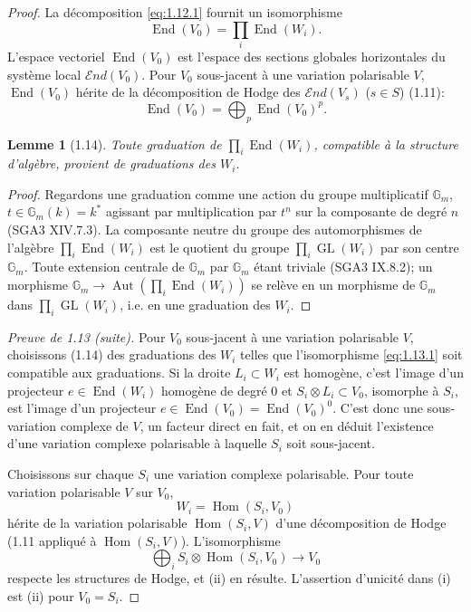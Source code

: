 \documentclass[12pt,a4paper]{article}
\theoremstyle{plain}
\newtheorem{lemma}{Lemme}[section]
\theoremstyle{definition}
\DeclareMathOperator{\End}{End}
\DeclareMathOperator{\Hom}{Hom}
\DeclareMathOperator{\Aut}{Aut}
\DeclareMathOperator{\GL}{GL}
\begin{document}
\begin{proof}
La d\'{e}composition \eqref{eq:1.12.1} fournit un isomorphisme
\begin{equation}\label{eq:1.13.1}
\End(V_{0}) = \prod_{i} \End(W_{i}).
\end{equation}
L'espace vectoriel $\End(V_{0})$ est l'espace des sections globales horizontales du syst\`{e}me local $\mathcal{E}nd(V_{0})$. Pour $V_{0}$ sous-jacent \`{a} une variation polarisable $V$, $\End(V_{0})$ h\'{e}rite de la d\'{e}composition de Hodge des $\mathcal{E}nd(V_{s})$ ($s \in S$) (1.11):
\[
\End(V_{0}) = \bigoplus_{p} \End(V_{0})^{p}.
\]

\begin{lemma}[1.14]
Toute graduation de $\prod_{i} \End(W_{i})$, compatible \`{a} la structure d'alg\`{e}bre, provient de graduations des $W_{i}$.
\end{lemma}

\begin{proof}
Regardons une graduation comme une action du groupe multiplicatif $\mathbb{G}_{m}$, $t \in \mathbb{G}_{m}(k) = k^{*}$ agissant par multiplication par $t^{n}$ sur la composante de degr\'{e} $n$ (SGA3 XIV.7.3). La composante neutre du groupe des automorphismes de l'alg\`{e}bre $\prod_{i} \End(W_{i})$ est le quotient du groupe $\prod_{i} \GL(W_{i})$ par son centre $\mathbb{G}_{m}$. Toute extension centrale de $\mathbb{G}_{m}$ par $\mathbb{G}_{m}$ \'{e}tant triviale (SGA3 IX.8.2); un morphisme $\mathbb{G}_{m} \to \Aut(\prod_{i} \End(W_{i}))$ se rel\`{e}ve en un morphisme de $\mathbb{G}_{m}$ dans $\prod_{i} \GL(W_{i})$, i.e. en une graduation des $W_{i}$.
\end{proof}

\textit{Preuve de 1.13 (suite).} Pour $V_{0}$ sous-jacent \`{a} une variation polarisable $V$, choisissons (1.14) des graduations des $W_{i}$ telles que l'isomorphisme \eqref{eq:1.13.1} soit compatible aux graduations. Si la droite $L_{i} \subset W_{i}$ est homog\`{e}ne, c'est l'image d'un projecteur $e \in \End(W_{i})$ homog\`{e}ne de degr\'{e} $0$ et $S_{i} \otimes L_{i} \subset V_{0}$, isomorphe \`{a} $S_{i}$, est l'image d'un projecteur $e \in \End(V_{0}) = \End(V_{0})^{0}$. C'est donc une sous-variation complexe de $V$, un facteur direct en fait, et on en d\'{e}duit l'existence d'une variation complexe polarisable \`{a} laquelle $S_{i}$ soit sous-jacent.

Choisissons sur chaque $S_{i}$ une variation complexe polarisable. Pour toute variation polarisable $V$ sur $V_{0}$,
\[
W_{i} = \Hom(S_{i}, V_{0})
\]
h\'{e}rite de la variation polarisable $\Hom(S_{i}, V)$ d'une d\'{e}composition de Hodge (1.11 appliqu\'{e} \`{a} $\Hom(S_{i}, V)$). L'isomorphisme
\[
\bigoplus_{i} S_{i} \otimes \Hom(S_{i}, V_{0}) \to V_{0}
\]
respecte les structures de Hodge, et (ii) en r\'{e}sulte. L'assertion d'unicit\'{e} dans (i) est (ii) pour $V_{0} = S_{i}$.
\end{proof}
\end{document}
